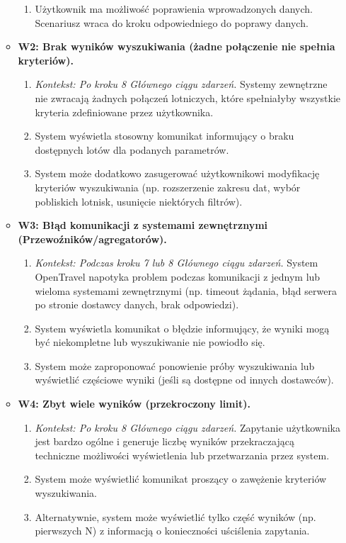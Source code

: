 \documentclass[a4paper,12pt]{article}
\begin{document}
\begin{itemize}
\begin{itemize}
\begin{enumerate}
                    \item Użytkownik ma możliwość poprawienia wprowadzonych danych. Scenariusz wraca do kroku odpowiedniego do poprawy danych.
                \end{enumerate}
            \item \textbf{W2: Brak wyników wyszukiwania (żadne połączenie nie spełnia kryteriów).}
                \begin{enumerate}
                    \item \textit{Kontekst: Po kroku 8 Głównego ciągu zdarzeń.} Systemy zewnętrzne nie zwracają żadnych połączeń lotniczych, które spełniałyby wszystkie kryteria zdefiniowane przez użytkownika.
                    \item System wyświetla stosowny komunikat informujący o braku dostępnych lotów dla podanych parametrów.
                    \item System może dodatkowo zasugerować użytkownikowi modyfikację kryteriów wyszukiwania (np. rozszerzenie zakresu dat, wybór pobliskich lotnisk, usunięcie niektórych filtrów).
                \end{enumerate}
            \item \textbf{W3: Błąd komunikacji z systemami zewnętrznymi (Przewoźników/agregatorów).}
                \begin{enumerate}
                    \item \textit{Kontekst: Podczas kroku 7 lub 8 Głównego ciągu zdarzeń.} System OpenTravel napotyka problem podczas komunikacji z jednym lub wieloma systemami zewnętrznymi (np. timeout żądania, błąd serwera po stronie dostawcy danych, brak odpowiedzi).
                    \item System wyświetla komunikat o błędzie informujący, że wyniki mogą być niekompletne lub wyszukiwanie nie powiodło się.
                    \item System może zaproponować ponowienie próby wyszukiwania lub wyświetlić częściowe wyniki (jeśli są dostępne od innych dostawców).
                \end{enumerate}
            \item \textbf{W4: Zbyt wiele wyników (przekroczony limit).}
                \begin{enumerate}
                    \item \textit{Kontekst: Po kroku 8 Głównego ciągu zdarzeń.} Zapytanie użytkownika jest bardzo ogólne i generuje liczbę wyników przekraczającą techniczne możliwości wyświetlenia lub przetwarzania przez system.
                    \item System może wyświetlić komunikat proszący o zawężenie kryteriów wyszukiwania.
                    \item Alternatywnie, system może wyświetlić tylko część wyników (np. pierwszych N) z informacją o konieczności uściślenia zapytania.
                \end{enumerate}
        \end{itemize}
\end{itemize}
\end{document}
